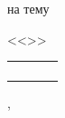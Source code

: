 \begin{center}
\begin{center}
		\vspace{0.4cm}



		{\smaller[1]
			на тему

			<<\Title>>}
	\end{center}

	\vfill

	\large

	\begin{tabular}{p{}P{0.25\textwidth}P{0.01\textwidth}P{0.25\textwidth}}
		 \\[10pt]
		             \\[10pt]
	\end{tabular}

	\vfill

	\City, \Year

\end{center}




